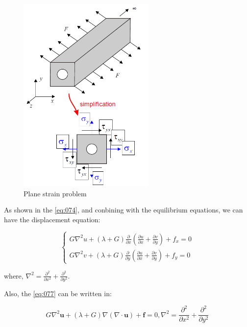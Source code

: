 \documentclass[en,hazy,cyan,8pt,normal]{elegantnote}
\numberwithin{equation}{section}
\begin{document}
    \begin{figure}[H]
      \centering
      \includegraphics[width=0.6\textwidth]{image/026.png}
      \caption{Plane strain problem}
      \label{fig:026}
    \end{figure}

    As shown in the \cref{eq:074}, and conbining with the equilibrium equations, we can have the displacement equation:
    
    \begin{equation}\label{eq:077}
      \left\{
      \begin{aligned}
        G \nabla^2 u+(\lambda+G) \frac{\partial}{\partial x}(\frac{\partial u}{\partial x} + \frac{\partial v}{\partial y}) + f_x = 0 \\
        G \nabla^2 v+(\lambda+G) \frac{\partial}{\partial y}(\frac{\partial u}{\partial x} + \frac{\partial v}{\partial y}) + f_y = 0
      \end{aligned}
      \right.
    \end{equation}

    where, $\displaystyle \nabla^2 = \frac{\partial^2}{\partial x^2} + \frac{\partial^2}{\partial y^2}$.

    Also, the \cref{eq:077} can be written in:

    \begin{equation}\label{eq:078}
      G \nabla^2 \mathbf{u} + (\lambda + G) \nabla (\nabla \cdot \mathbf{u}) + \mathbf{f} = 0, \nabla^2 = \frac{\partial^2}{\partial x^2} + \frac{\partial^2}{\partial y^2}
    \end{equation}
    
\end{document}
